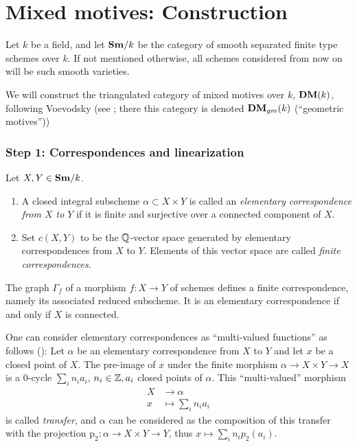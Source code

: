 \section{Mixed motives: Construction}
\label{sec:9-construction}
Let $k$ be a field, and let $\mathbf{Sm}/k$ be the category of smooth
separated finite type schemes over $k$. If not mentioned otherwise,
all schemes considered from now on will be such smooth varieties.

We will construct the triangulated category of mixed motives over $k$,
$\mathbf{DM}(k)$, following Voevodsky (see \cite[2]{voevodsky00-mm}; there this category is
denoted $\mathbf{DM}_{gm}(k)$ (``geometric motives''))

\subsubsection{Step 1: Correspondences and linearization}

\begin{defn}Let $X, Y \in \mathbf{Sm}/k$.
  \begin{enumerate}
  \item A closed integral subscheme $\alpha \subset X \times Y$ is
    called an \emph{elementary correspondence from $X$ to $Y$} if it
    is finite and surjective over a connected component of $X$.
  \item Set $c(X,Y)$ to be the $\mathbb{Q}$-vector space generated by
    elementary correspondences from $X$ to $Y$. Elements of this
    vector space are called \emph{finite correspondences}.
\end{enumerate}
\end{defn}

\begin{exam}
  The graph $\Gamma_f$ of a morphism $f : X \to Y$ of schemes defines
  a finite correspondence, namely its associated reduced subscheme. It
  is an elementary correspondence if and only if $X$ is connected.
\end{exam}

\begin{rem}
  One can consider elementary correspondences as ``multi-valued
  functions'' as follows (\cite[15.1.2]{andre04-motifs}): Let $\alpha$
  be an elementary correspondence from $X$ to $Y$ and let $x$ be a
  closed point of $X$. The pre-image of $x$ under the finite morphism
  $\alpha\to X\times Y\to X$ is a 0-cycle $\sum_{i}n_{i}a_{i}$,
  $n_{i}\in\mathbb{Z}, a_{i}$ closed points of $\alpha$. This ``multi-valued''
  morphism
  \begin{align*}
    X&\to \alpha\\
    x&\mapsto \sum_{i}n_{i}a_{i}
  \end{align*}
  is called \emph{transfer}, and $\alpha$ can be considered as the
  composition of this transfer with the projection $\mathrm{p}_{2}:\alpha\to X\times
  Y\to Y$, thus $x\mapsto\sum_{i}n_{i}p_{2}(a_{i})$.
\end{rem}

